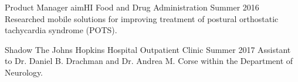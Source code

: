 

\begin{cventries}

  \cventry
    {Product Manager} %
    {aimHI} %
    {Food and Drug Administration} %
    {Summer 2016} %
    {Researched mobile solutions for improving treatment of postural orthostatic tachycardia syndrome (POTS).}

  \cventry
    {Shadow} %
    {The Johns Hopkins Hospital} %
    {Outpatient Clinic} %
    {Summer 2017} %
    {Assistant to Dr. Daniel B. Drachman and Dr. Andrea M. Corse within the Department of Neurology.}

\end{cventries}
